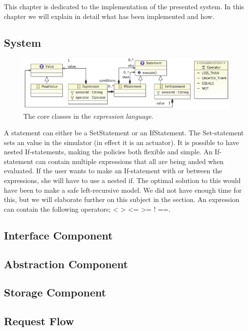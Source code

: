 This chapter is dedicated to the implementation of the presented system. In this chapter we will explain in detail what has been implemented and how. 

\subsection{System}

\begin{figure}
	\centering
    \includegraphics[scale=0.55]{chapters/implementation-model-expression-language.png} 
	\caption{The core classes in the \textit{expression language}.}
	\label{fig:ecore-sensors-actuators}
\end{figure}

A statement can either be a SetStatement or an IfStatement. The Set-statement sets an value in the simulator (in effect it is an actuator). It is possible to have nested If-statements, making the policies both flexible and simple. An If-statement can contain multiple expressions that all are being anded when evaluated. If the user wants to make an If-statement with or between the expressions, she will have to use a nested if. The optimal solution to this would have been to make a safe left-recursive model. We did not have enough time for this, but we will elaborate further on this subject in the  section. An expression can contain the following operators; < > <= >= ! ==. 


\subsection{Interface Component}

\subsection{Abstraction Component}

\subsection{Storage Component}

\subsection{Request Flow}